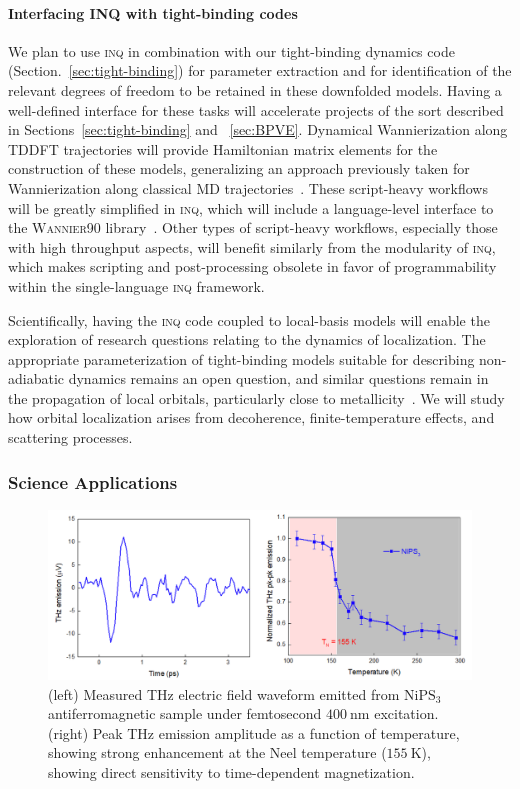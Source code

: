 \paragraph{Interfacing \textsc{INQ} with tight-binding codes}\label{sec:future-tb}

We plan to use \textsc{inq} in combination with our tight-binding dynamics code (Section.~\ref{sec:tight-binding}) for parameter extraction and for identification of the relevant degrees of freedom to be retained in these downfolded models. 
Having a well-defined interface for these tasks will accelerate projects of the sort described in Sections~\ref{sec:tight-binding} and ~\ref{sec:BPVE}. Dynamical Wannierization along TDDFT trajectories will provide Hamiltonian matrix elements for the construction of these models, generalizing an approach previously taken for Wannierization along classical MD trajectories~\cite{Abramovitch2021}. 
These script-heavy workflows will be greatly simplified in \textsc{inq}, which will include a language-level interface to the \textsc{Wannier90} library~\cite{Mostofi2008}. 
Other types of script-heavy workflows, especially those with high throughput aspects, will benefit similarly from the modularity of \textsc{inq}, which makes scripting and post-processing obsolete in favor of programmability within the single-language \textsc{inq} framework.

Scientifically, having the \textsc{inq} code coupled to local-basis models will enable the exploration of research questions relating to the dynamics of localization. 
The appropriate parameterization of tight-binding models suitable for describing non-adiabatic dynamics remains an open question, and similar questions remain in the propagation of local orbitals, particularly close to metallicity~\cite{Yost2019}. 
We will study how orbital localization arises from decoherence, finite-temperature effects, and scattering processes.  

\subsubsection{Science Applications}
\begin{figure}[ht]
	\centering\includegraphics[width=0.7\linewidth]{figures/NiPS3}
	\caption{
		(left)  Measured THz electric field waveform emitted from \(\mathrm{NiPS_3}\) antiferromagnetic sample under femtosecond \(400~\mathrm{nm}\) excitation.
		(right) Peak THz emission amplitude as a function of temperature, showing strong enhancement at the Neel temperature (\(155~\mathrm{K}\)), showing direct sensitivity to time-dependent magnetization.
	}
	\label{fig:NiPS3}
\end{figure}

